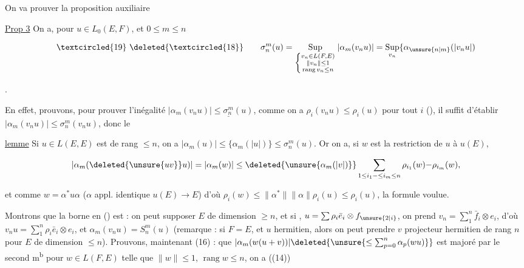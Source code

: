 
On va prouver la proposition auxiliaire

\uline{Prop 3} On a, pour $u\in L_0(E,F)$, et $0\leq m\leq n$

\[
\begin{array}{@{}l@{\qquad}l@{}}
\textcircled{19}\ \deleted{\textcircled{18}} &
\displaystyle \sigma_n^m(u)=\operatorname*{Sup}_{\left\{\substack{v_n\in L(F,E)\\\lVert v_n\rVert\leq1\\\operatorname{rang}v_n\leq n}\right.}|\alpha_m(v_nu)|=\operatorname*{Sup}_{v_n}\{\alpha_{\unsure{n|m}}(|v_nu|)
\end{array}
\]

.

En effet, prouvons,   pour prouver l'inégalité  $|\alpha_m(v_nu)|\leq\underline{\sigma_n^m}(u)$, comme on a $\rho_i(v_nu)\leq\rho_i(u)$ pour tout $i$ (\unsure{---}), il suffit d'établir $|\alpha_m(v_nu)|\leq\sigma_n^m(v_nu)$, donc le

\uline{lemme} Si $u\in L(E,E)$ est de rang $\leq n$, on a $|\alpha_m(u)|\leq\{\alpha_m(|u|)\}\leq\sigma_n^m(u)$. Or on a, si $w$ est la restriction de $u$ à $u(E)$, 

\[
|\alpha_m(\deleted{\unsure{uv}}u)|=|\alpha_m(w)|\leq\deleted{\unsure{\alpha_m(|v|)}}\sum_{1\leq i_1\mathord{-}\leq i_m\leq n}\rho_{i_1}(w)\mathord{-}\rho_{i_m}(w),
\]

et comme  $w=\alpha^*u\alpha$ ($\alpha$ appl. identique $u(E)\longrightarrow E$) d'où $\rho_i(w)\leq\lVert\alpha^*\rVert\lVert\alpha\rVert\rho_i(u)\leq\rho_i(u)$, la formule voulue.


 Montrons que la borne en () est  : on peut supposer $E$ de dimension $\geq n$,  et si , $u=\sum\rho_i\bar e_i\otimes f_{\unsure{2|i}}$, on prend $v_n=\sum_1^n\bar f_i\otimes e_i$, d'où $v_nu=\sum_1^n\rho_i\bar e_i\otimes e_i$, et $\alpha_m(v_nu)=S_n^m(u)$ (remarque : si $F=E$, et $u$ hermitien, alors on peut prendre $v$ projecteur hermitien de rang $n$ pour $E$ de dimension $\leq n$).
Prouvons, maintenant (16) :   que $|\alpha_m(w(u+v))|\deleted{\unsure{\leq\sum_{p=0}^{n}\alpha_p(wu)}}$ est majoré par le second m\textsuperscript{b} pour  $w\in L(F,E)$ telle que $\lVert w\rVert\leq1$, $\operatorname{rang}w\leq n$,   on a ((14))

